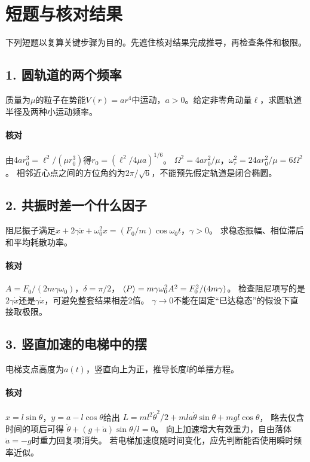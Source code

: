 \section{短题与核对结果}
下列短题以复算关键步骤为目的。先遮住核对结果完成推导，再检查条件和极限。

\subsection*{1. 圆轨道的两个频率}
质量为$\mu$的粒子在势能$V(r) = ar^4$中运动，$a > 0$。给定非零角动量$\ell$，求圆轨道半径及两种小运动频率。

\paragraph{核对}
由$4ar_0^3 = \ell^2/(\mu r_0^3)$得$r_0 = (\ell^2/4\mu a)^{1/6}$。
$\Omega^2 = 4ar_0^2/\mu$，$\omega_r^2 = 24ar_0^2/\mu = 6\Omega^2$。
相邻近心点之间的方位角约为$2\pi/\sqrt6$，不能预先假定轨道是闭合椭圆。

\subsection*{2. 共振时差一个什么因子}
阻尼振子满足$\ddot x + 2\gamma\dot x + \omega_0^2x = (F_0/m)\cos\omega_0t$，$\gamma > 0$。
求稳态振幅、相位滞后和平均耗散功率。

\paragraph{核对}
$A = F_0/(2m\gamma\omega_0)$，$\delta = \pi/2$，
$\langle P\rangle = m\gamma\omega_0^2A^2 = F_0^2/(4m\gamma)$。
检查阻尼项写的是$2\gamma\dot x$还是$\gamma\dot x$，可避免整套结果相差2倍。
$\gamma \to 0$不能在固定“已达稳态”的假设下直接取极限。

\subsection*{3. 竖直加速的电梯中的摆}
电梯支点高度为$a(t)$，竖直向上为正，推导长度$l$的单摆方程。

\paragraph{核对}
$x = l\sin\theta$，$y = a - l\cos\theta$给出
$L = ml^2\dot\theta^2/2 + ml\dot a\dot\theta\sin\theta + mgl\cos\theta$，
略去仅含时间的项后可得
$\ddot\theta + (g + \ddot a)\sin\theta/l = 0$。
向上加速增大有效重力，自由落体$\ddot a = -g$时重力回复项消失。
若电梯加速度随时间变化，应先判断能否使用瞬时频率近似。

